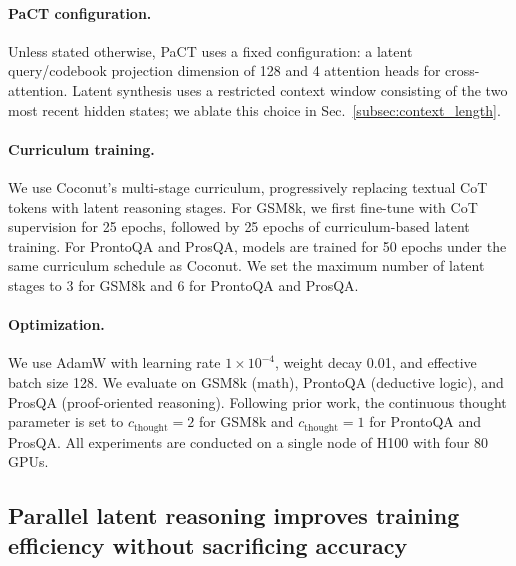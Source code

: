 \paragraph{PaCT configuration.}
Unless stated otherwise, PaCT uses a fixed configuration: a latent query/codebook projection dimension of 128 and
4 attention heads for cross-attention. Latent synthesis uses a restricted context window consisting of the two most
recent hidden states; we ablate this choice in Sec.~\ref{subsec:context_length}.
\vspace{-4mm}
\paragraph{Curriculum training.}
We use Coconut’s multi-stage curriculum, progressively replacing textual CoT tokens with latent reasoning stages.
For GSM8k, we first fine-tune with CoT supervision for 25 epochs, followed by 25 epochs of curriculum-based latent
training. For ProntoQA and ProsQA, models are trained for 50 epochs under the same curriculum schedule as Coconut.
We set the maximum number of latent stages to 3 for GSM8k and 6 for ProntoQA and ProsQA.
\vspace{-4mm}
\paragraph{Optimization.}
We use AdamW with learning rate $1\times 10^{-4}$, weight decay 0.01, and effective batch size 128. We evaluate on
GSM8k (math), ProntoQA (deductive logic), and ProsQA (proof-oriented reasoning). Following prior work, the continuous
thought parameter is set to $c_{\text{thought}}=2$ for GSM8k and $c_{\text{thought}}=1$ for ProntoQA and ProsQA.
All experiments are conducted on a single node of H100 with four 80 GPUs.

\subsection{Parallel latent reasoning improves training efficiency without sacrificing accuracy}
\label{sec:efficiency}

